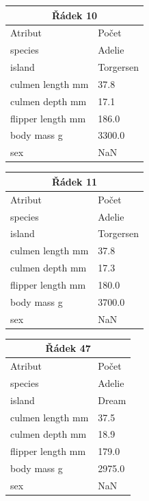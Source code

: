 \documentclass[10pt,xcolor=pdflatex,dvipsnames,table,oneside]{book}
\begin{document}
\begin{tabular}{|l|l|}
    \hline
    \multicolumn{2}{|c|}{Řádek 10} \\
    \hline
    \hline
    Atribut & Počet \\
    \hline
    \hline
    species           &    Adelie \\
    island            & Torgersen \\
    culmen length mm  &      37.8 \\
    culmen depth mm   &      17.1 \\
    flipper length mm &     186.0 \\
    body mass g       &    3300.0 \\
    sex               &       NaN \\
    \hline
\end{tabular}
\begin{tabular}{|l|l|}
    \hline
    \multicolumn{2}{|c|}{Řádek 11} \\
    \hline
    \hline
    Atribut & Počet \\
    \hline
    \hline
    species           &    Adelie \\
    island            & Torgersen \\
    culmen length mm  &      37.8 \\
    culmen depth mm   &      17.3 \\
    flipper length mm &     180.0 \\
    body mass g       &    3700.0 \\
    sex               &       NaN \\
    \hline
\end{tabular}
\begin{tabular}{|l|l|}
    \hline
    \multicolumn{2}{|c|}{Řádek 47} \\
    \hline
    \hline
    Atribut & Počet \\
    \hline
    \hline
    species           & Adelie \\
    island            &  Dream \\
    culmen length mm  &   37.5 \\
    culmen depth mm   &   18.9 \\
    flipper length mm &  179.0 \\
    body mass g       & 2975.0 \\
    sex               &    NaN \\
    \hline
\end{tabular}
\end{document}
